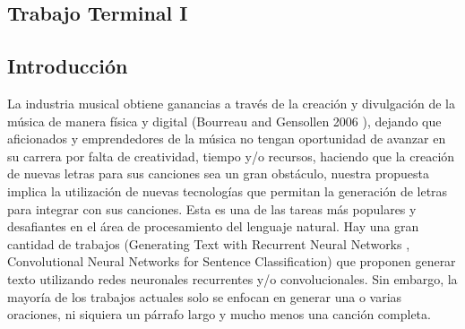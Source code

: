 \documentclass[12pt, a4paper, titlepage]{report}
\begin{document}
	\begin{appendices}
		\renewcommand*\contentsname{{\textcolor{azulescom}{Índice.}}}
		\tableofcontents
		\newpage
		\renewcommand*\listfigurename{{\textcolor{azulescom}{Índice de figuras.}}}
		\listoffigures
		\newpage
		\newpage
		\renewcommand*\listtablename{{\textcolor{azulescom}{Índice de cuadros.}}}
		\listoftables
		
		\newpage
		\renewcommand*\glossaryname{{\textcolor{azulescom}{Glosario.}}}
		\printglossary
		\renewcommand*\glossaryname{{\textcolor{azulescom}{Acrónimos.}}}
		\printglossary[title={\textcolor{azulescom}{Acrónimos.}}, type=\acronymtype]
	\end{appendices}
	
   \textcolor{guindapoli}{\part{Trabajo Terminal I}}
    
    \renewcommand\thechapter{\arabic{chapter}}
    \renewcommand{\appendixname}{Capítulo}
    \renewcommand{\lstlistingname}{C\'odigo}
    \renewcommand{\thepart}{}
    \renewcommand{\partname}{}
    \chapter{\textcolor{azulescom}{Introducción}}
    La industria musical obtiene ganancias a través de la creación y divulgación de la música de manera física y digital (Bourreau and Gensollen 2006 \cite{Bourreau_and_Gensollen}), dejando que aficionados y emprendedores de la música no tengan oportunidad de avanzar en su carrera por falta de creatividad, tiempo y/o recursos, haciendo que la creación de nuevas letras para sus canciones sea un gran obstáculo, nuestra propuesta implica la utilización de nuevas tecnologías que permitan la generación de letras para integrar con sus canciones. Esta es una de las tareas más populares y desafiantes en el área de procesamiento del lenguaje natural. Hay una gran cantidad de trabajos (Generating Text with Recurrent Neural Networks \cite{Generating_Text_with_RNN}, Convolutional Neural Networks for Sentence Classification\cite{CNN_for_Sentence_Classification}) que proponen generar texto utilizando redes neuronales recurrentes y/o convolucionales. Sin embargo, la mayoría de los trabajos actuales solo se enfocan en generar una o varias oraciones, ni siquiera un párrafo largo y mucho menos una canción completa.\par
    
\end{document}

